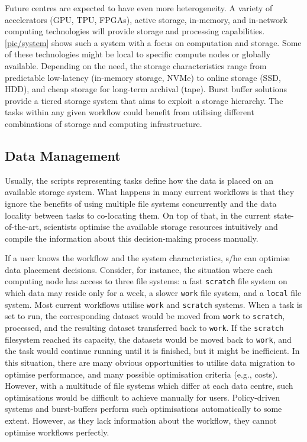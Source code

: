 \documentclass{superfri}
\begin{document}
Future centres are expected to have even more heterogeneity. A variety of accelerators (GPU, TPU, FPGAs), active storage, in-memory, and in-network computing technologies will provide storage and processing capabilities.
\cref{pic/system} shows such a system with a focus on computation and storage.
Some of these technologies might be local to specific compute nodes or globally available.
Depending on the need, the storage characteristics range from predictable low-latency (in-memory storage, NVMe) to online storage (SSD, HDD), and cheap storage for long-term archival (tape).
Burst buffer solutions provide a tiered storage system that aims to exploit a storage hierarchy. %
The tasks within any given workflow could benefit from utilising different combinations of storage and computing infrastructure.


\subsection{Data Management}
\label{sec:datamanagement}

Usually, the scripts representing tasks define how the data is placed on an available storage system.
What happens in many current workflows is that they ignore the benefits of using multiple file systems concurrently and the data locality between tasks to co-locating them.
On top of that, in the current state-of-the-art, scientists optimise the available storage resources intuitively and compile the information about this decision-making process manually.

If a user knows the workflow and the system characteristics, s/he can optimise data placement decisions.
Consider, for instance, the situation where each computing node has access to three file systems: a fast \texttt{scratch} file system on which data may reside only for a week, a slower \texttt{work} file system, and a \texttt{local} file system.
Most current workflows utilise \texttt{work} and \texttt{scratch} systems.
When a task is set to run, the corresponding dataset would be moved from \texttt{work} to \texttt{scratch}, processed, and the resulting dataset transferred back to \texttt{work}.
If the \texttt{scratch} filesystem reached its capacity, the datasets would be moved back to \texttt{work}, and the task would continue running until it is finished, but it might be inefficient. %
In this situation, there are many obvious opportunities to utilise data migration to optimise performance, and many possible optimisation criteria (e.g., costs).
However, with a multitude of file systems which differ at each data centre, such optimisations would be difficult to achieve manually for users.
Policy-driven systems and burst-buffers perform such optimisations automatically to some extent. However, as they lack information about the workflow, they cannot optimise workflows perfectly.
\end{document}
